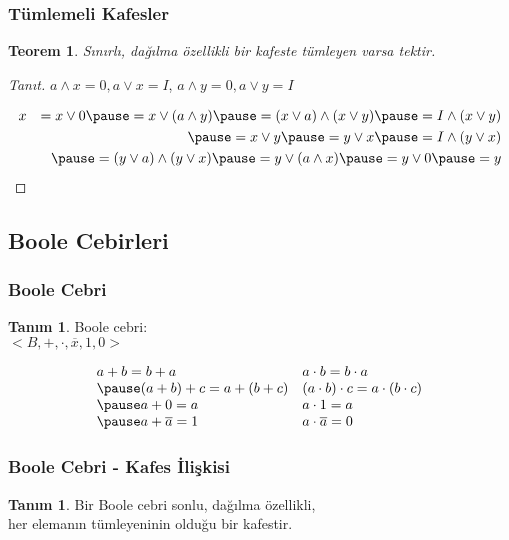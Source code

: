 \documentclass[dvipsnames]{beamer}
\theoremstyle{definition}
\newtheorem{tanim}[theorem]{Tanım}
\theoremstyle{example}
\theoremstyle{plain}
\newtheorem{teorem}[theorem]{Teorem}
\begin{document}
\begin{frame}
  \frametitle{Tümlemeli Kafesler}

  \begin{teorem}
    Sınırlı, dağılma özellikli bir kafeste tümleyen varsa tektir.
  \end{teorem}

  \pause
  \begin{proof}[Tanıt]
    $a \wedge x = 0, a \vee x = I$, $a \wedge y = 0, a \vee y = I$

    \pause
    \medskip
    \begin{eqnarray*}
  & x & = x \vee 0 \pause = x \vee (a \wedge y) \pause = (x \vee a) \wedge (x \vee y) \pause = I \wedge (x \vee y)\\
  &   & \pause = x \vee y \pause = y \vee x \pause = I \wedge (y \vee x)\\
  &   & \pause = (y \vee a) \wedge (y \vee x) \pause = y \vee (a \wedge x) \pause = y \vee 0 \pause = y\\
    \end{eqnarray*}
  \end{proof}
\end{frame}

\subsection{Boole Cebirleri}

\begin{frame}
  \frametitle{Boole Cebri}

  \begin{tanim}
    \alert{Boole cebri}:\\
    $<B,+,\cdot,\overline{x},1,0>$

    \pause
    \[\begin{array}{ll}
      a + b = b + a &
      a \cdot b = b \cdot a\\ \pause
      (a + b) + c = a + (b + c) &
      (a \cdot b) \cdot c = a \cdot (b \cdot c)\\ \pause
      a + 0 = a &
      a \cdot 1 = a\\ \pause
      a + \overline{a} = 1 &
      a \cdot \overline{a} = 0
    \end{array}\]
  \end{tanim}
\end{frame}

\begin{frame}
  \frametitle{Boole Cebri - Kafes İlişkisi}

  \begin{tanim}
    Bir Boole cebri sonlu, dağılma özellikli,\\
    her elemanın tümleyeninin olduğu bir kafestir.
  \end{tanim}
\end{frame}
\end{document}
